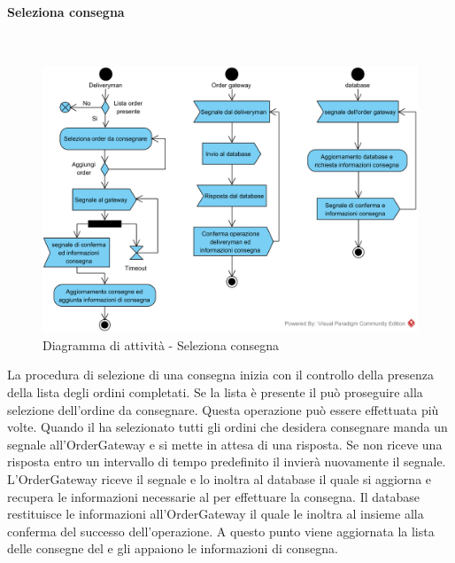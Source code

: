\paragraph{Seleziona consegna}\mbox{}\\
\nopagebreak
\begin{figure}[H]
	\centering
	\includegraphics[width=14cm]{diagrammi_img/attivita/deliveryman_seleziona.png}
	\caption{Diagramma di attività - Seleziona consegna}
\end{figure}
La procedura di selezione di una consegna inizia con il controllo della presenza della lista degli ordini completati. Se la lista è presente il \Deliveryman{} può proseguire alla selezione dell'ordine da consegnare. Questa operazione può essere effettuata più volte. Quando il \Deliveryman{} ha selezionato tutti gli ordini che desidera consegnare manda un segnale all'OrderGateway e si mette in attesa di una risposta. Se non riceve una risposta entro un intervallo di tempo predefinito il \Deliveryman{} invierà nuovamente il segnale. L'OrderGateway riceve il segnale e lo inoltra al database il quale si aggiorna e recupera le informazioni necessarie al \Deliveryman{} per effettuare la consegna. Il database restituisce le informazioni all'OrderGateway il quale le inoltra al \Deliveryman{} insieme alla conferma del successo dell'operazione. A questo punto viene aggiornata la lista delle consegne del \Deliveryman{} e gli appaiono le informazioni di consegna.

